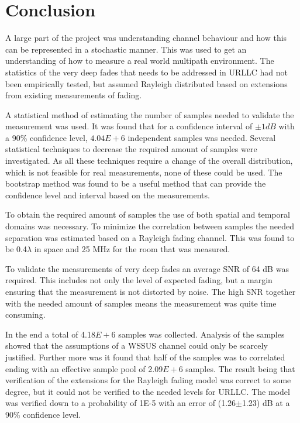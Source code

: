 \chapter{Conclusion}

A large part of the project was understanding channel behaviour and how this can be represented in a stochastic manner. This was used to get an understanding of how to measure a real world multipath environment. The statistics of the very deep fades that needs to be addressed in \gls{URLLC} had not been empirically tested, but assumed Rayleigh distributed based on extensions from existing measurements of fading.

A statistical method of estimating the number of samples needed to validate the measurement was used. It was found that for a confidence interval of $\pm 1dB$ with a 90\% confidence level, $4.04E+6$ independent samples was needed. Several statistical techniques to decrease the required amount of samples were investigated. As all these techniques require a change of the overall distribution, which is not feasible for real measurements, none of these could be used. The bootstrap method was found to be a useful method that can provide the confidence level and interval based on the measurements.

To obtain the required amount of samples the use of both spatial and temporal domains was necessary. To minimize the correlation between samples the needed separation was estimated based on a Rayleigh fading channel. This was found to be 0.4$\lambda$ in space and 25 MHz for the room that was measured. 


To validate the measurements of very deep fades an average SNR of 64 dB was required. This includes not only the level of expected fading, but a margin ensuring that the measurement is not distorted by noise. The high SNR together with the needed amount of samples means the measurement was quite time consuming. 

In the end a total of 4.18$E+6$ samples was collected. Analysis of the samples showed that the assumptions of a WSSUS channel could only be scarcely justified. Further more was it found that half of the samples was to correlated ending with an effective sample pool of 2.09$E+6$ samples. The result being that verification of the extensions for the Rayleigh fading model was correct to some degree, but it could not be verified to the needed levels for \gls{URLLC}. The model was verified down to a probability of 1E-5 with an error of (1.26$\pm$1.23) dB at a 90\% confidence level. 

